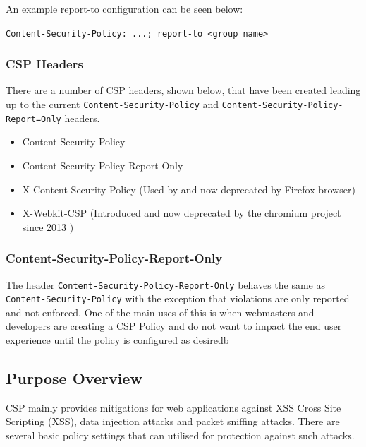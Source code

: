 \documentclass{mscreport}
\begin{document}
\vspace{0.3cm} \noindent
An example report-to configuration can be seen below:

\vspace{0.3cm} \noindent
\texttt{Content-Security-Policy: ...; report-to <group name>}

\subsubsection{CSP Headers}

There are a number of CSP headers, shown below, that have been created leading up to the current \texttt{Content-Security-Policy} and \texttt{Content-Security-Policy-Report=Only} headers.

\begin{itemize}
	\setlength\itemsep{0.1em}
	\item Content-Security-Policy
	\item Content-Security-Policy-Report-Only
	\item X-Content-Security-Policy (Used by and now deprecated by Firefox browser)
	\item X-Webkit-CSP (Introduced and now deprecated by the chromium project since 2013 \cite{Google_undated-ct})
\end{itemize}


\subsubsection{Content-Security-Policy-Report-Only}

The header \texttt{Content-Security-Policy-Report-Only} behaves the same as \newline \texttt{Content-Security-Policy} with the exception that violations are only reported and not enforced. One of the main uses of this is when webmasters and developers are creating a CSP Policy and do not want to impact the end user experience until the policy is configured as desiredb


\subsection{Purpose Overview}

CSP mainly provides mitigations for web applications against XSS Cross Site Scripting (XSS), data injection attacks and packet sniffing attacks. There are several basic policy settings that can utilised for protection against such attacks.
\end{document}
